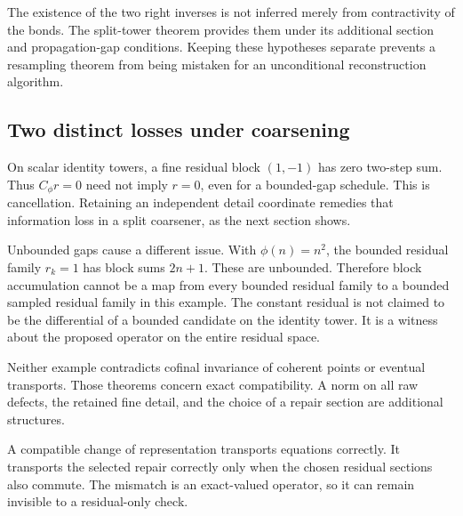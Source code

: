 The existence of the two right inverses is not inferred merely from contractivity of the bonds. The split-tower theorem provides them under its additional section and propagation-gap conditions. Keeping these hypotheses separate prevents a resampling theorem from being mistaken for an unconditional reconstruction algorithm.

\subsection{Two distinct losses under coarsening}
On scalar identity towers, a fine residual block \((1,-1)\) has zero two-step sum. Thus \(C_\phi r=0\) need not imply \(r=0\), even for a bounded-gap schedule. This is cancellation. Retaining an independent detail coordinate remedies that information loss in a split coarsener, as the next section shows.

Unbounded gaps cause a different issue. With \(\phi(n)=n^2\), the bounded residual family \(r_k=1\) has block sums \(2n+1\). These are unbounded. Therefore block accumulation cannot be a map from every bounded residual family to a bounded sampled residual family in this example. The constant residual is not claimed to be the differential of a bounded candidate on the identity tower. It is a witness about the proposed operator on the entire residual space.

Neither example contradicts cofinal invariance of coherent points or eventual transports. Those theorems concern exact compatibility. A norm on all raw defects, the retained fine detail, and the choice of a repair section are additional structures.

\begin{insight}
A compatible change of representation transports equations correctly. It transports the selected repair correctly only when the chosen residual sections also commute. The mismatch is an exact-valued operator, so it can remain invisible to a residual-only check.
\end{insight}
